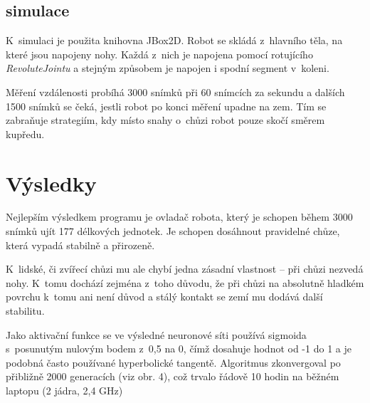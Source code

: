 \documentclass[a4]{article}
\begin{document}
\subsection{simulace}
K~simulaci je použita knihovna JBox2D\cite{jbox2D}. Robot se skládá z~hlavního těla, na které jsou napojeny nohy. Každá z~nich je napojena pomocí rotujícího \emph{RevoluteJointu} a stejným způsobem je napojen i spodní segment v~koleni.\par
Měření vzdálenosti probíhá 3000 snímků při 60 snímcích za sekundu a dalších 1500 snímků se čeká, jestli robot po konci měření upadne na zem. Tím se zabraňuje strategiím, kdy místo snahy o~chůzi robot pouze skočí směrem kupředu.\par
\section{Výsledky}
Nejlepším výsledkem programu je ovladač robota, který je schopen během 3000 snímků ujít 177 délkových jednotek. Je schopen dosáhnout pravidelné chůze, která vypadá stabilně a přirozeně.\par 
K~lidské, či zvířecí chůzi mu ale chybí jedna zásadní vlastnost -- při chůzi nezvedá nohy. K~tomu dochází zejména z~toho důvodu, že při chůzi na absolutně hladkém povrchu k~tomu ani není důvod a stálý kontakt se zemí mu dodává další stabilitu.\par
Jako aktivační funkce se ve výsledné neuronové síti používá sigmoida s~posunutým nulovým bodem z~0,5 na 0, čímž dosahuje hodnot od -1 do 1 a je podobná často používané hyperbolické tangentě.
Algoritmus zkonvergoval po přibližně 2000 generacích (viz obr. 4), což trvalo řádově 10 hodin na běžném laptopu (2 jádra, 2,4 GHz)
\end{document}
